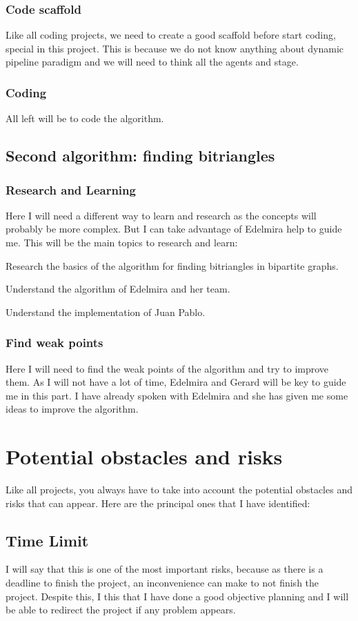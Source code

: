 \subsubsection*{Code scaffold}
Like all coding projects, we need to create a good scaffold before start coding, special in this project.
This is because we do not know anything about dynamic pipeline paradigm and we will need to think all the agents and stage.
\subsubsection*{Coding}
All left will be to code the algorithm.
\subsection*{Second algorithm: finding bitriangles}
\subsubsection*{Research and Learning}
Here I will need a different way to learn and research as the concepts will probably be more complex.
But I can take advantage of Edelmira help to guide me.
This will be the main topics to research and learn:
\begin{list}{-}{}
     \item Research the basics of the algorithm for finding bitriangles in bipartite graphs.
     \item Understand the algorithm of Edelmira and her team.
     \item Understand the implementation of Juan Pablo.
\end{list}
\subsubsection*{Find weak points}
Here I will need to find the weak points of the algorithm and try to improve them.
As I will not have a lot of time, Edelmira and Gerard will be key to guide me in this part.
I have already spoken with Edelmira and she has given me some ideas to improve the algorithm.
\section{Potential obstacles and risks}
Like all projects, you always have to take into account the potential obstacles and risks that can appear.
Here are the principal ones that I have identified:
\subsection{Time Limit}
I will say that this is one of the most important risks, because as there is a deadline to finish the project, an inconvenience can make to not finish the project.
Despite this, I this that I have done a good objective planning and I will be able to redirect the project if any problem appears.
